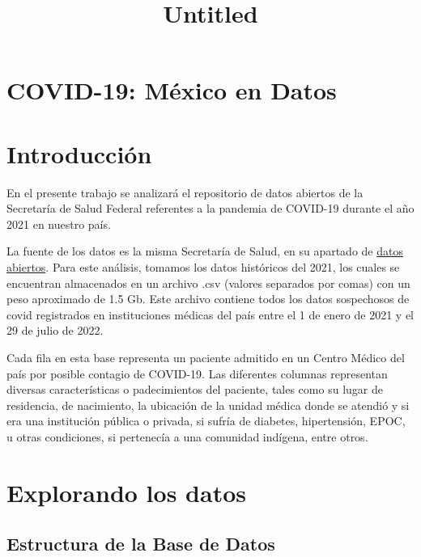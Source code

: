 \documentclass[11pt]{article}
\title{Untitled}
\begin{document}
    
    \maketitle
    
    

    
    \hypertarget{covid-19-muxe9xico-en-datos}{%
\section{COVID-19: México en Datos}\label{covid-19-muxe9xico-en-datos}}

\hypertarget{introducciuxf3n}{%
\section{Introducción}\label{introducciuxf3n}}

En el presente trabajo se analizará el repositorio de datos abiertos de
la Secretaría de Salud Federal referentes a la pandemia de COVID-19
durante el año 2021 en nuestro país.

La fuente de los datos es la misma Secretaría de Salud, en su apartado
de
\href{https://www.gob.mx/salud/documentos/datos-abiertos-152127}{datos
abiertos}. Para este análisis, tomamos los datos históricos del 2021,
los cuales se encuentran almacenados en un archivo .csv (valores
separados por comas) con un peso aproximado de 1.5 Gb. Este archivo
contiene todos los datos sospechosos de covid registrados en
instituciones médicas del país entre el 1 de enero de 2021 y el 29 de
julio de 2022.

Cada fila en esta base representa un paciente admitido en un Centro
Médico del país por posible contagio de COVID-19. Las diferentes
columnas representan diversas características o padecimientos del
paciente, tales como su lugar de residencia, de nacimiento, la ubicación
de la unidad médica donde se atendió y si era una institución pública o
privada, si sufría de diabetes, hipertensión, EPOC, u otras condiciones,
si pertenecía a una comunidad indígena, entre otros.

\hypertarget{explorando-los-datos}{%
\section{Explorando los datos}\label{explorando-los-datos}}

\hypertarget{estructura-de-la-base-de-datos}{%
\subsection{Estructura de la Base de
Datos}\label{estructura-de-la-base-de-datos}}
\end{document}
